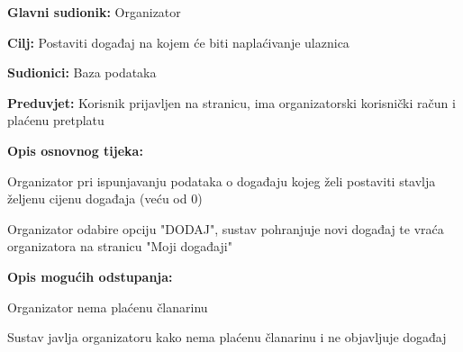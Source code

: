 					\noindent {}
\begin{packed_item}
	\item \textbf{Glavni sudionik:} Organizator
	\item  \textbf{Cilj:} Postaviti događaj na kojem će biti naplaćivanje ulaznica
	\item  \textbf{Sudionici:} Baza podataka
	\item  \textbf{Preduvjet:} Korisnik prijavljen na stranicu, ima organizatorski korisnički račun i plaćenu pretplatu
	\item  \textbf{Opis osnovnog tijeka:}
	
	\item[] \begin{packed_enum}
		
		\item Organizator pri ispunjavanju podataka o događaju kojeg želi postaviti stavlja željenu cijenu događaja (veću od 0) 
		\item  Organizator odabire opciju "DODAJ", sustav pohranjuje novi događaj te vraća organizatora na stranicu "Moji događaji"
	\end{packed_enum}
	
	\item  \textbf{Opis mogućih odstupanja:}
	
	\item[] \begin{packed_item}
		
		\item[2.a] Organizator nema plaćenu članarinu
		\item[] \begin{packed_enum}
			
			\item Sustav javlja organizatoru kako nema plaćenu članarinu i ne objavljuje događaj
			
		\end{packed_enum}

	\end{packed_item}
\end{packed_item}


